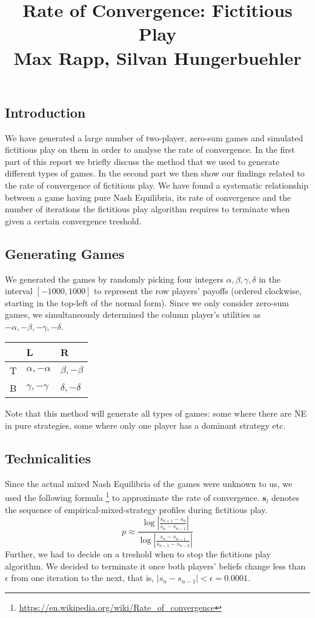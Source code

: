 \documentclass[10pt,a4paper]{article}
\title{%
  Rate of Convergence: Fictitious Play \\
  \large Max Rapp, Silvan Hungerbuehler}
\date{}
\begin{document}
\maketitle

\subsection*{Introduction}
We have generated a large number of two-player, zero-sum games and simulated fictitious play on them in order to analyse the rate of convergence. 
In the first part of this report we briefly discuss the method that we used to generate different types of games. In the second part we then show our findings related to the rate of convergence of fictitious play. We have found a systematic relationship between a game having pure Nash Equilibria, its rate of convergence and the number of iterations the fictitious play algorithm requires to terminate when given a certain convergence treshold.
\subsection*{Generating Games}
We generated the games by randomly picking four integers  $\alpha,\beta,\gamma,\delta$ in the interval $[-1000,1000]$ to represent the row players' payoffs (ordered clockwise, starting in the top-left of the normal form). Since we only consider zero-sum games, we simultaneously determined the column player's utilities as $-\alpha,-\beta,-\gamma,-\delta$.
\begin{table}[h]
\centering
\begin{tabular}{|l|l|l|}
\hline
  & L                & R                \\ \hline
T & $\alpha,-\alpha$ & $\beta,-\beta$   \\ \hline
B & $\gamma,-\gamma$ & $\delta,-\delta$ \\ \hline
\end{tabular}
\end{table}
Note that this method will generate all types of games: some where there are NE in pure strategies, some where only one player has a dominant strategy etc.
\subsection*{Technicalities}
Since the actual mixed Nash Equilibria of the games were unknown to us, we used the following formula \footnote{\url{https://en.wikipedia.org/wiki/Rate_of_convergence}
} to approximate the rate of convergence. $\boldsymbol{s}_l$ denotes the sequence of empirical-mixed-strategy profiles during fictitious play.
\begin{equation*}
p\approx\frac{\log{|\frac{s_{n+1}-s_{n}}{s_{n}-s_{n-1}}|}}{\log{|\frac{s_{n}-s_{n-1}}{s_{n-1}-s_{n-2}}|}}
\end{equation*}
Further, we had to decide on a treshold when to stop the fictitious play algorithm. We decided to terminate it once both players' beliefs change less than $\epsilon$ from one iteration to the next, that is, $|s_n-s_{n-1}|<\epsilon=0.0001$. 
\end{document}
